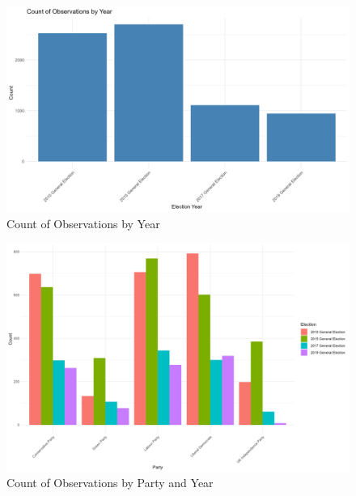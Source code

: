 \documentclass[12pt,letterpaper]{article}
\begin{document}
\begin{figure}[H]  %
	\centering
	\includegraphics[width=\textwidth, height=0.7\textheight, keepaspectratio]{count_by_year.png} %
	\caption{Count of Observations by Year}
	\label{fig:count_by_year}
\end{figure}




\begin{figure}[H]
	\centering
	\includegraphics[width=\textwidth, height=0.6\textheight, keepaspectratio]{count_by_party_year.png} %
	\caption{Count of Observations by Party and Year}
	\label{fig:count_by_party_year}
\end{figure}
\end{document}
